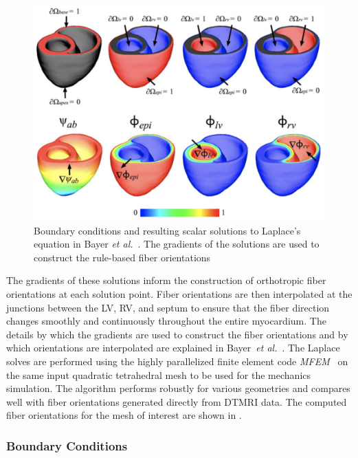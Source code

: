 \begin{figure}[ht]
\centering
		\includegraphics[scale=0.3]{media/bayer.png}
\caption{Boundary conditions and resulting scalar solutions to Laplace's equation in Bayer \textit{et al.}~\cite{bayer_2012}. The gradients of the solutions are used to construct the rule-based fiber orientations}
\label{fig:bayer}
\end{figure}

The gradients of these solutions inform the construction of orthotropic fiber orientations at each solution point. Fiber orientations are then interpolated at the junctions between the LV, RV, and septum to ensure that the fiber direction changes smoothly and continuously throughout the entire myocardium. The details by which the gradients are used to construct the fiber orientations and by which orientations are interpolated are explained in Bayer~\textit{et al.}~\cite{bayer_2012}. The Laplace solves are performed using the highly parallelized finite element code \textit{MFEM}~\cite{mfem-library} on the same input quadratic tetrahedral mesh to be used for the mechanics simulation. The algorithm performs robustly for various geometries and compares well with fiber orientations generated directly from DTMRI data. The computed fiber orientations for the mesh of interest are shown in .

\subsubsection{Boundary Conditions}
\label{Boundary Conditions}

